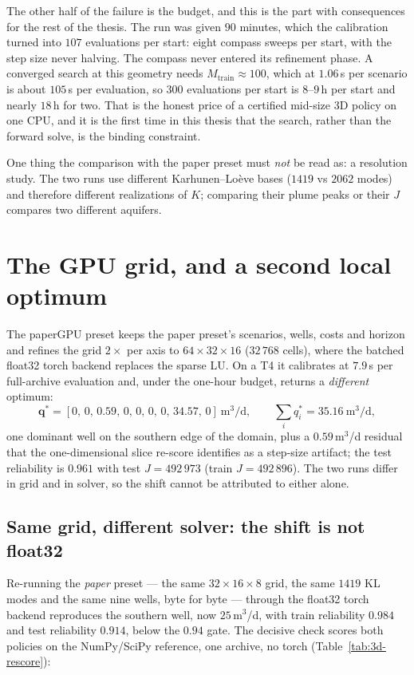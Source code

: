 The other half of the failure is the budget, and this is the part with
consequences for the rest of the thesis. The run was given $90$ minutes, which
the calibration turned into $107$ evaluations per start: eight compass sweeps
per start, with the step size never halving. The compass never entered
its refinement phase. A converged search at this geometry needs
$M_{\text{train}}\approx100$, which at $1.06$\,s per scenario is about
$105$\,s per evaluation, so $300$ evaluations per start is $8$--$9$\,h per
start and nearly $18$\,h for two. That is the honest price of a certified
mid-size 3D policy on one CPU, and it is the first time in this thesis that the
search, rather than the forward solve, is the binding constraint.

One thing the comparison with the paper preset must \emph{not} be read as: a
resolution study. The two runs use different Karhunen--Lo\`eve bases ($1419$ vs
$2062$ modes) and therefore different realizations of $K$; comparing their plume
peaks or their $J$ compares two different aquifers.

\section{The GPU grid, and a second local optimum}
\label{sec:3d-gpu}

The paperGPU preset keeps the paper preset's scenarios, wells, costs and horizon
and refines the grid $2\times$ per axis to $64\times32\times16$ ($32\,768$
cells), where the batched float32 torch backend replaces the sparse LU. On a T4
it calibrates at $7.9$\,s per full-archive evaluation and, under the one-hour
budget, returns a \emph{different} optimum:
\[
  \mathbf{q}^* = [0,\,0,\,0.59,\,0,\,0,\,0,\,0,\,34.57,\,0]\ \mathrm{m^3/d},
  \qquad \textstyle\sum_i q^*_i = 35.16\ \mathrm{m^3/d},
\]
one dominant well on the southern edge of the domain, plus a $0.59$\,m$^3$/d
residual that the one-dimensional slice re-score identifies as a step-size
artifact; the test reliability is $0.961$ with test $J=492\,973$ (train
$J=492\,896$). The two runs differ in grid and in solver, so the shift cannot be
attributed to either alone.

\subsection*{Same grid, different solver: the shift is not float32}

Re-running the \emph{paper} preset --- the same $32\times16\times8$ grid, the
same $1419$ KL modes and the same nine wells, byte for byte --- through the
float32 torch backend reproduces the southern well, now $25$\,m$^3$/d, with
train reliability $0.984$ and test reliability $0.914$, below the $0.94$ gate.
The decisive check scores both policies on the NumPy/SciPy reference, one
archive, no torch (Table~\ref{tab:3d-rescore}):

